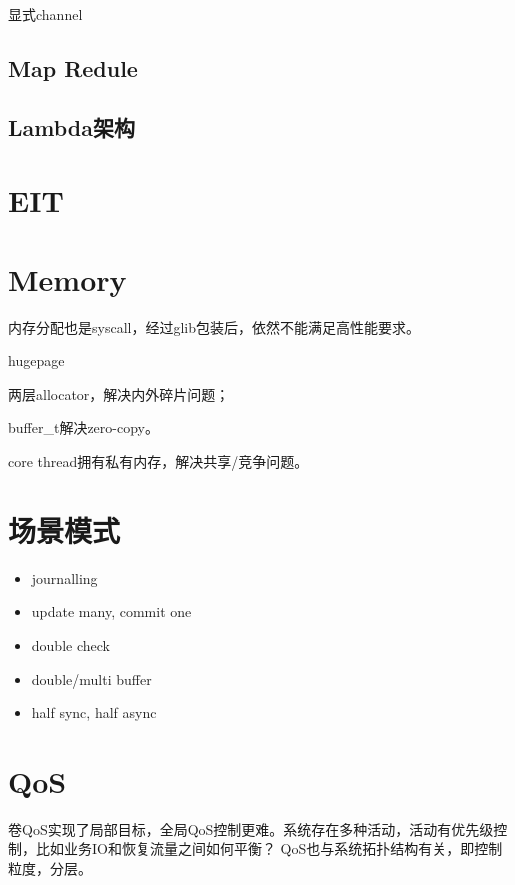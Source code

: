显式channel

\subsection{Map Redule}

\subsection{Lambda架构}

\section{EIT}

\section{Memory}

内存分配也是syscall，经过glib包装后，依然不能满足高性能要求。

\begin{enumbox}
\item hugepage
\item 两层allocator，解决内外碎片问题；
\item buffer\_t解决zero-copy。
\item core thread拥有私有内存，解决共享/竞争问题。
\end{enumbox}

\section{场景模式}

\begin{itemize}
\item journalling
\item update many, commit one
\item double check
\item double/multi buffer
\item half sync, half async
\end{itemize}

\section{QoS}

卷QoS实现了局部目标，全局QoS控制更难。系统存在多种活动，活动有优先级控制，比如业务IO和恢复流量之间如何平衡？
QoS也与系统拓扑结构有关，即控制粒度，分层。
